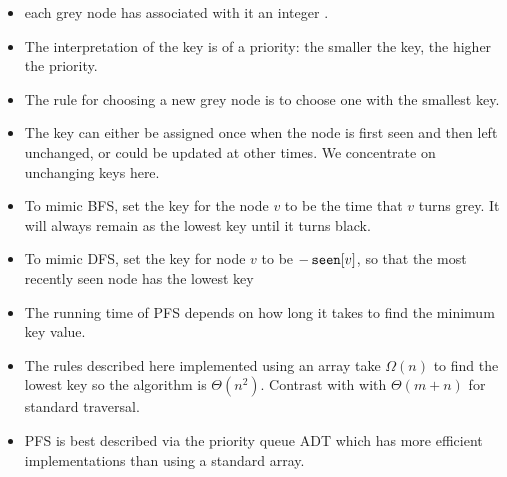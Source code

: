 \begin{itemize}
\item each grey node has associated with it an
integer . 
\item The interpretation of the key is of a priority: the
smaller the key, the higher the priority. 
\item The rule for choosing a new
grey node is to choose one with the smallest key.  
\item The key can either be assigned once when the node is first seen and then left unchanged, or could be updated at other times. We concentrate on unchanging keys here.
\item To mimic BFS, set the key for the node $v$ to be the time that $v$ turns grey. It will always remain as the lowest key until it turns black.
\item To mimic DFS, set the key for node $v$ to be $-\seen[v]$, so that the most recently seen node has the lowest key
\item The running time of PFS depends on how long it takes to find the minimum key value.
\item The rules described here implemented using an array take $\Omega(n)$ to find the lowest key so the algorithm is $\Theta(n^2)$. Contrast with with $\Theta(m+n)$ for standard traversal.
\item PFS is best described via the priority
queue ADT which has more efficient implementations than using a standard array.
\end{itemize}


%
%
%

